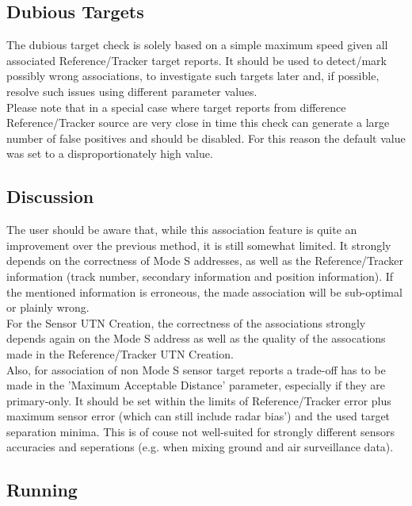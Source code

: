 \subsection{Dubious Targets}

The dubious target check is solely based on a simple maximum speed given all associated Reference/Tracker target reports. It should be used to detect/mark possibly wrong associations, to investigate such targets later and, if possible, resolve such issues using different parameter values. \\

Please note that in a special case where target reports from difference Reference/Tracker source are very close in time this check can generate a large number of false positives and should be disabled. For this reason the default value was set to a disproportionately high value.

\subsection{Discussion}

The user should be aware that, while this association feature is quite an improvement over the previous method, it is still somewhat limited. It strongly depends on the correctness of Mode S addresses, as well as the Reference/Tracker information (track number, secondary information and position information). If the mentioned information is erroneous, the made association will be sub-optimal or plainly wrong. \\

For the Sensor UTN Creation, the correctness of the associations strongly depends again on the Mode S address as well as the quality of the assocations made in the Reference/Tracker UTN Creation. \\

Also, for association of non Mode S sensor target reports a trade-off has to be made in the 'Maximum Acceptable Distance' parameter, especially if they are primary-only. It should be set within the limits of Reference/Tracker error plus maximum sensor error (which can still include radar bias') and the used target separation minima. This is of couse not well-suited for strongly different sensors accuracies and seperations (e.g. when mixing ground and air surveillance data). \\

\subsection{Running}

